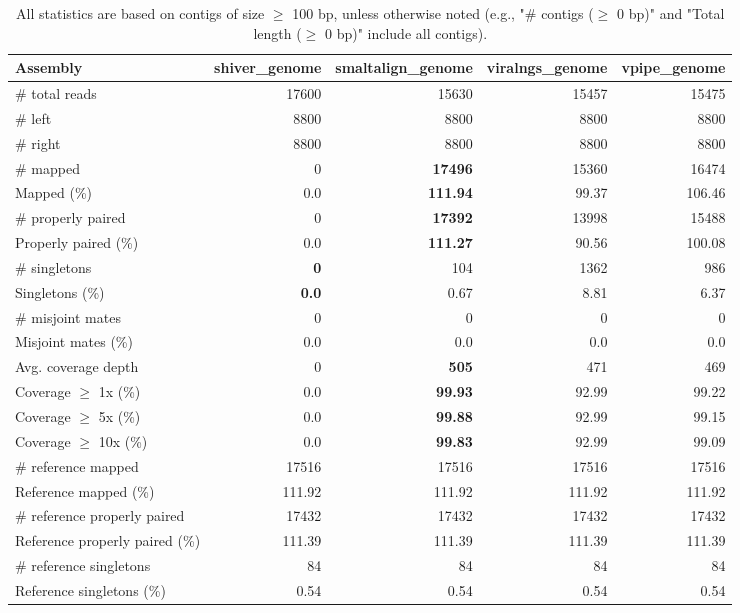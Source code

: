\documentclass[12pt,a4paper]{article}
\begin{document}
\begin{table}[ht]
\begin{center}
\caption{All statistics are based on contigs of size $\geq$ 100 bp, unless otherwise noted (e.g., "\# contigs ($\geq$ 0 bp)" and "Total length ($\geq$ 0 bp)" include all contigs).}
\begin{tabular}{|l*{4}{|r}|}
\hline
Assembly & shiver\_genome & smaltalign\_genome & viralngs\_genome & vpipe\_genome \\ \hline
\# total reads & 17600 & 15630 & 15457 & 15475 \\ \hline
\# left & 8800 & 8800 & 8800 & 8800 \\ \hline
\# right & 8800 & 8800 & 8800 & 8800 \\ \hline
\# mapped & 0 & {\bf 17496} & 15360 & 16474 \\ \hline
Mapped (\%) & 0.0 & {\bf 111.94} & 99.37 & 106.46 \\ \hline
\# properly paired & 0 & {\bf 17392} & 13998 & 15488 \\ \hline
Properly paired (\%) & 0.0 & {\bf 111.27} & 90.56 & 100.08 \\ \hline
\# singletons & {\bf 0} & 104 & 1362 & 986 \\ \hline
Singletons (\%) & {\bf 0.0} & 0.67 & 8.81 & 6.37 \\ \hline
\# misjoint mates & 0 & 0 & 0 & 0 \\ \hline
Misjoint mates (\%) & 0.0 & 0.0 & 0.0 & 0.0 \\ \hline
Avg. coverage depth & 0 & {\bf 505} & 471 & 469 \\ \hline
Coverage $\geq$ 1x (\%) & 0.0 & {\bf 99.93} & 92.99 & 99.22 \\ \hline
Coverage $\geq$ 5x (\%) & 0.0 & {\bf 99.88} & 92.99 & 99.15 \\ \hline
Coverage $\geq$ 10x (\%) & 0.0 & {\bf 99.83} & 92.99 & 99.09 \\ \hline
\# reference mapped & 17516 & 17516 & 17516 & 17516 \\ \hline
Reference mapped (\%) & 111.92 & 111.92 & 111.92 & 111.92 \\ \hline
\# reference properly paired & 17432 & 17432 & 17432 & 17432 \\ \hline
Reference properly paired (\%) & 111.39 & 111.39 & 111.39 & 111.39 \\ \hline
\# reference singletons & 84 & 84 & 84 & 84 \\ \hline
Reference singletons (\%) & 0.54 & 0.54 & 0.54 & 0.54 \\ \hline

\end{tabular}
\end{center}
\end{table}
\end{document}

